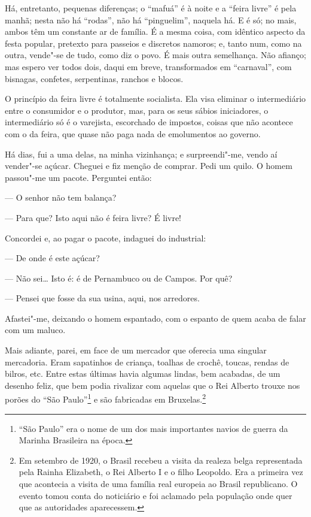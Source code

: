 Há, entretanto, pequenas diferenças; o ``mafuá'' é à noite e a ``feira
livre'' é pela manhã; nesta não há ``rodas'', não há ``pinguelim'',
naquela há. E é só; no mais, ambos têm um constante ar de família. É a
mesma coisa, com idêntico aspecto da festa popular, pretexto para
passeios e discretos namoros; e, tanto num, como na outra, vende"-se de
tudo, como diz o povo. É mais outra semelhança. Não afianço; mas espero
ver todos dois, daqui em breve, transformados em ``carnaval'', com
bisnagas, confetes, serpentinas, ranchos e blocos.

O princípio da feira livre é totalmente socialista. Ela visa eliminar o
intermediário entre o consumidor e o produtor, mas, para os seus sábios
iniciadores, o intermediário só é o varejista, escorchado de impostos,
coisas que não acontece com o da feira, que quase não paga nada de
emolumentos ao governo.

Há dias, fui a uma delas, na minha vizinhança; e surpreendi"-me, vendo aí
vender"-se açúcar. Cheguei e fiz menção de comprar. Pedi um quilo. O
homem passou"-me um pacote. Perguntei então:

--- O senhor não tem balança?

--- Para que? Isto aqui não é feira livre? É livre!

Concordei e, ao pagar o pacote, indaguei do industrial:

--- De onde é este açúcar?

--- Não sei\ldots{} Isto é: é de Pernambuco ou de Campos. Por quê?

--- Pensei que fosse da sua usina, aqui, nos arredores.

Afastei"-me, deixando o homem espantado, com o espanto de quem acaba de
falar com um maluco.

Mais adiante, parei, em face de um mercador que oferecia uma singular
mercadoria. Eram sapatinhos de criança, toalhas de crochê, toucas,
rendas de bilros, etc. Entre estas últimas havia algumas lindas, bem
acabadas, de um desenho feliz, que bem podia rivalizar com aquelas que o
Rei Alberto trouxe nos porões do ``São Paulo''\footnote{``São Paulo''
  era o nome de um dos mais importantes navios de guerra da Marinha
  Brasileira na época.} e são fabricadas em Bruxelas.\footnote{Em
  setembro de 1920, o Brasil recebeu a visita da realeza belga
  representada pela Rainha Elizabeth, o Rei Alberto I e o filho
  Leopoldo. Era a primeira vez que acontecia a visita de uma família
  real europeia ao Brasil republicano. O evento tomou conta do
  noticiário e foi aclamado pela população onde quer que as autoridades
  aparecessem.}

